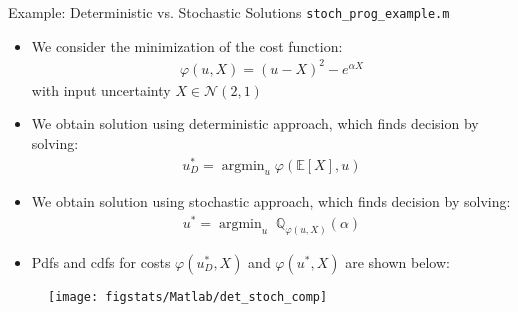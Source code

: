 \documentclass[9pt]{beamer}
\begin{document}
%
\begin{frame}{Example: Deterministic vs. Stochastic Solutions \footnotesize{\texttt{stoch\_prog\_example.m}}}

\begin{itemize}
\setlength{\itemsep}{5pt}
\item We consider the minimization of the cost function:
\begin{align*}
\varphi(u,X)=(u-X)^2-e^{\alpha X}
\end{align*}
with  input uncertainty $X\in \mathcal{N}(2,1)$
\item We obtain solution using deterministic approach, which finds decision by solving:
\begin{align*}
u_D^*=\mathop{\textrm{argmin}}_{u}\varphi (\mathbb{E}[X],u)
\end{align*}
\item We obtain solution using stochastic approach, which finds decision by solving:
\begin{align*}
u^*=\mathop{\textrm{argmin}}_u\; \mathbb{Q}_{\varphi(u,X)}(\alpha)
\end{align*}
\item Pdfs and cdfs for costs $\varphi(u^*_D,X)$ and $\varphi(u^*,X)$ are shown below:
\end{itemize}
\vspace{-0.1in}
\begin{figure}[!htb]
    \centering
	\texttt{[image: figstats/Matlab/det\_stoch\_comp]}
\end{figure}

\end{frame}

% 
\end{document}

